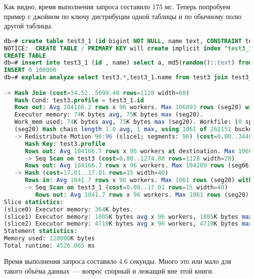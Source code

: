 Как видно, время выполнения запроса составило 175 мс. Теперь попробуем пример с джойном по ключу дистрибуции одной таблицы и по обычному полю другой таблицы.

\begin{lstlisting}[language=SQL,label=lst:greenplum_example6,caption=JOIN по ключу дистрибуции одной таблицы и по обычному полю другой]
db=# create table test3_1 (id bigint NOT NULL, name text, CONSTRAINT test3_1_id_pkey PRIMARY KEY (id)) distributed by (id);
NOTICE:  CREATE TABLE / PRIMARY KEY will create implicit index "test3_1_pkey" for table "test3_1"
CREATE TABLE
db=# insert into test3_1 (id , name) select a, md5(random()::text) from generate_series(1,100000) a;
INSERT 0 100000
db=# explain analyze select test3.*,test3_1.name from test3 join test3_1 on test3.profile=test3_1.id;

-> Hash Join (cost=34.52..5099.48 rows=1128 width=60)
   Hash Cond: test3.profile = test3_1.id
   Rows out: Avg 104166.2 rows x 96 workers. Max 106093 rows (seg20) with 7.644 ms to first row, 103 ms to end, start offset by 223 ms.
   Executor memory: 74K bytes avg, 75K bytes max (seg20).
   Work_mem used: 74K bytes avg, 75K bytes max (seg20). Workfile: (0 spilling, 0 reused)
   (seg20) Hash chain length 1.0 avg, 1 max, using 1061 of 262151 buckets.
   -> Redistribute Motion 96:96 (slice1; segments: 96) (cost=0.00..3440.64 rows=1128 width=28)
      Hash Key: test3.profile
      Rows out: Avg 104166.7 rows x 96 workers at destination. Max 106093 rows (seg20) with 3.160 ms to first row, 44 ms to end, start offset by 228 ms.
      -> Seq Scan on test3 (cost=0.00..1274.88 rows=1128 width=28)
      Rows out: Avg 104166.7 rows x 96 workers. Max 104209 rows (seg66) with 0.165 ms to first row, 16 ms to end, start offset by 228 ms.
   -> Hash (cost=17.01..17.01 rows=15 width=40)
      Rows in: Avg 1041.7 rows x 96 workers. Max 1061 rows (seg20) with 1.059 ms to end, start offset by 227 ms.
      -> Seq Scan on test3_1 (cost=0.00..17.01 rows=15 width=40)
         Rows out: Avg 1041.7 rows x 96 workers. Max 1061 rows (seg20) with 0.126 ms to first row, 0.498 ms to end, start offset by 227 ms.
Slice statistics:
(slice0) Executor memory: 364K bytes.
(slice1) Executor memory: 1805K bytes avg x 96 workers, 1805K bytes max (seg0).
(slice2) Executor memory: 4710K bytes avg x 96 workers, 4710K bytes max (seg0). Work_mem: 75K bytes max.
Statement statistics:
Memory used: 128000K bytes
Total runtime: 4526.065 ms
\end{lstlisting}

Время выполнения запроса составило 4.6 секунды. Много это или мало для такого объёма данных~--- вопрос спорный и лежащий вне этой книги.



